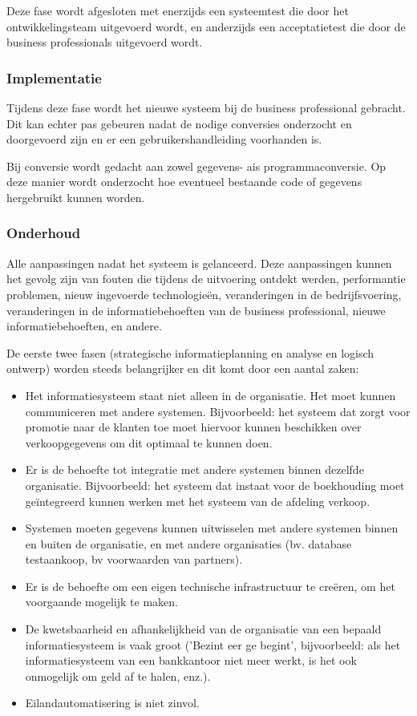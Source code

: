 Deze fase wordt afgesloten met enerzijds een systeemtest die door het ontwikkelingsteam uitgevoerd wordt, en anderzijds een acceptatietest die door de business professionals uitgevoerd wordt.

\subsubsection{Implementatie}

Tijdens deze fase wordt het nieuwe systeem bij de business professional gebracht. Dit kan echter pas gebeuren nadat de nodige conversies onderzocht en doorgevoerd zijn en er een gebruikershandleiding voorhanden is.

Bij conversie wordt gedacht aan zowel gegevens- ais programmaconversie. Op deze manier wordt onderzocht hoe eventueel bestaande code of gegevens hergebruikt kunnen worden.

\subsubsection{Onderhoud}

Alle aanpassingen nadat het systeem is gelanceerd. Deze aanpassingen kunnen het gevolg zijn van fouten die tijdens de uitvoering ontdekt werden, performantie problemen, nieuw ingevoerde technologieën, veranderingen in de bedrijfsvoering, veranderingen in de informatiebehoeften van de business professional, nieuwe informatiebehoeften, en andere.

De eerste twee fasen (strategische informatieplanning en analyse en logisch ontwerp) worden steeds belangrijker en dit komt door een aantal zaken:

\begin{itemize}
    \item Het informatiesysteem staat niet alleen in de organisatie. Het moet kunnen communiceren met andere systemen. Bijvoorbeeld: het systeem dat zorgt voor promotie naar de klanten toe moet hiervoor kunnen beschikken over verkoopgegevens om dit optimaal te kunnen doen.
    \item Er is de behoefte tot integratie met andere systemen binnen dezelfde organisatie. Bijvoorbeeld: het systeem dat instaat voor de boekhouding moet geïntegreerd kunnen werken met het systeem van de afdeling verkoop.
    \item Systemen moeten gegevens kunnen uitwisselen met andere systemen binnen en buiten de organisatie, en met andere organisaties (bv. database testaankoop, bv voorwaarden van partners).
    \item Er is de behoefte om een eigen technische infrastructuur te creëren, om het voorgaande mogelijk te maken.
    \item De kwetsbaarheid en afhankelijkheid van de organisatie van een bepaald informatiesysteem is vaak groot ('Bezint eer ge begint', bijvoorbeeld: als het informatiesysteem van een bankkantoor niet meer werkt, is het ook onmogelijk om geld af te halen, enz.).
    \item Eilandautomatisering is niet zinvol.
\end{itemize}

